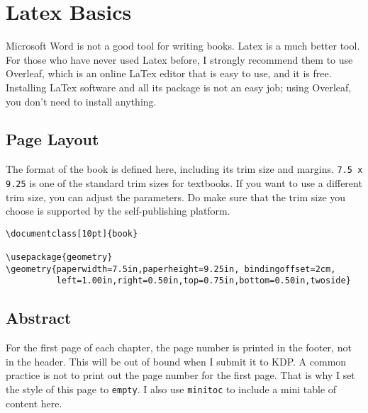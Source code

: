 

\chapter{Latex Basics}
\label{chapter:basics}

\thispagestyle{empty}


Microsoft Word is not a good tool for writing books. Latex is a much
better tool. 
For those who have never used Latex before, I strongly recommend 
them to use Overleaf, which is an online LaTex editor that is easy to use,
and it is free. Installing LaTex software and all its package is not 
an easy job; using Overleaf, you don't need to install anything. 


\minitoc
\newpage



\section{Page Layout} 

The format of the book is defined here, including its trim size and 
margins. \texttt{7.5 x 9.25} is one of the standard trim sizes for 
textbooks. 
If you want to use a different trim size, you can adjust the
parameters. Do make sure that the trim size you choose is supported by the
self-publishing platform.  


\begin{lstlisting}
\documentclass[10pt]{book}

\usepackage{geometry}
\geometry{paperwidth=7.5in,paperheight=9.25in, bindingoffset=2cm,
          left=1.00in,right=0.50in,top=0.75in,bottom=0.50in,twoside}
\end{lstlisting}
 


\section{Abstract}
\label{basics:abstract}

For the first page of each chapter, the page number is printed in the footer, not
in the header. This will be out of bound when I submit it to KDP. 
A common practice is not to print out the page number for the first page.
That is why I set the style of this page to \texttt{empty}. 
I also use \texttt{minitoc} to include a mini table of content 
here. 

